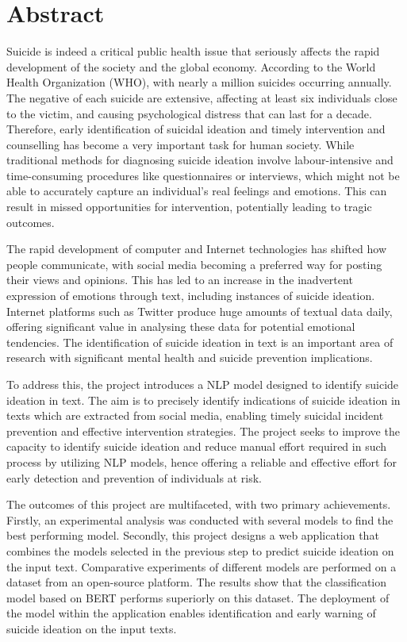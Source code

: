 \documentclass[ %
                    author={Bocheng Wang},
                supervisor={Dr. Qiang Liu},
                    degree={MSc},
                     title={A Research on Identification of Suicide Ideation in Texts with Multiple Models},
                      type={},
                      year={2024}]{dissertation}
\begin{document}
\chapter*{Abstract}
\noindent
Suicide is indeed a critical public health issue that seriously affects the rapid development of the society and the global economy. According to the World Health Organization (WHO), with nearly a million suicides occurring annually. The negative of each suicide are extensive, affecting at least six individuals close to the victim, and causing psychological distress that can last for a decade. Therefore, early identification of suicidal ideation and timely intervention and counselling has become a very important task for human society. While traditional methods for diagnosing suicide ideation involve labour-intensive and time-consuming procedures like questionnaires or interviews, which might not be able to accurately capture an individual's real feelings and emotions. This can result in missed opportunities for intervention, potentially leading to tragic outcomes.

The rapid development of computer and Internet technologies has shifted how people communicate, with social media becoming a preferred way for posting their views and opinions. This has led to an increase in the inadvertent expression of emotions through text, including instances of suicide ideation. Internet platforms such as Twitter produce huge amounts of textual data daily, offering significant value in analysing these data for potential emotional tendencies. The identification of suicide ideation in text is an important area of research with significant mental health and suicide prevention implications.

To address this, the project introduces a NLP model designed to identify suicide ideation in text. The aim is to precisely identify indications of suicide ideation in texts which are extracted from social media, enabling timely suicidal incident prevention and effective intervention strategies. The project seeks to improve the capacity to identify suicide ideation and reduce manual effort required in such process by utilizing NLP models, hence offering a reliable and effective effort for early detection and prevention of individuals at risk.

The outcomes of this project are multifaceted, with two primary achievements. Firstly, an experimental analysis was conducted with several models to find the best performing model. Secondly, this project designs a web application that combines the models selected in the previous step to predict suicide ideation on the input text. Comparative experiments of different models are performed on a dataset from an open-source platform. The results show that the classification model based on BERT performs superiorly on this dataset. The deployment of the model within the application enables identification and early warning of suicide ideation on the input texts.
\end{document}
